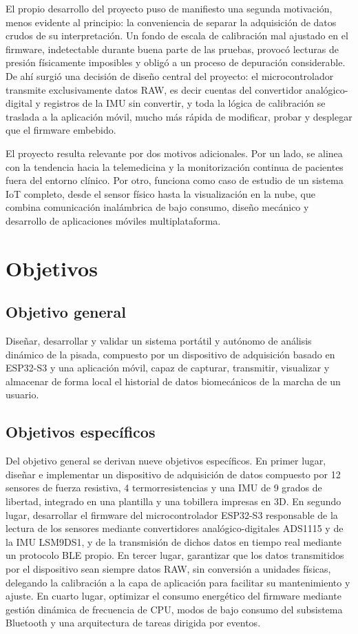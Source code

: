 \begin{IAtext}
El propio desarrollo del proyecto puso de manifiesto una segunda motivación, menos evidente al principio: la conveniencia de separar la adquisición de datos crudos de su interpretación. Un fondo de escala de calibración mal ajustado en el firmware, indetectable durante buena parte de las pruebas, provocó lecturas de presión físicamente imposibles y obligó a un proceso de depuración considerable. De ahí surgió una decisión de diseño central del proyecto: el microcontrolador transmite exclusivamente datos RAW, es decir cuentas del convertidor analógico-digital y registros de la IMU sin convertir, y toda la lógica de calibración se traslada a la aplicación móvil, mucho más rápida de modificar, probar y desplegar que el firmware embebido.

El proyecto resulta relevante por dos motivos adicionales. Por un lado, se alinea con la tendencia hacia la telemedicina y la monitorización continua de pacientes fuera del entorno clínico. Por otro, funciona como caso de estudio de un sistema IoT completo, desde el sensor físico hasta la visualización en la nube, que combina comunicación inalámbrica de bajo consumo, diseño mecánico y desarrollo de aplicaciones móviles multiplataforma.

\section{Objetivos}

\subsection{Objetivo general}

Diseñar, desarrollar y validar un sistema portátil y autónomo de análisis dinámico de la pisada, compuesto por un dispositivo de adquisición basado en ESP32-S3 y una aplicación móvil, capaz de capturar, transmitir, visualizar y almacenar de forma local el historial de datos biomecánicos de la marcha de un usuario.

\subsection{Objetivos específicos}

Del objetivo general se derivan nueve objetivos específicos. En primer lugar, diseñar e implementar un dispositivo de adquisición de datos compuesto por 12 sensores de fuerza resistiva, 4 termorresistencias y una IMU de 9 grados de libertad, integrado en una plantilla y una tobillera impresas en 3D. En segundo lugar, desarrollar el firmware del microcontrolador ESP32-S3 responsable de la lectura de los sensores mediante convertidores analógico-digitales ADS1115 y de la IMU LSM9DS1, y de la transmisión de dichos datos en tiempo real mediante un protocolo BLE propio. En tercer lugar, garantizar que los datos transmitidos por el dispositivo sean siempre datos RAW, sin conversión a unidades físicas, delegando la calibración a la capa de aplicación para facilitar su mantenimiento y ajuste. En cuarto lugar, optimizar el consumo energético del firmware mediante gestión dinámica de frecuencia de CPU, modos de bajo consumo del subsistema Bluetooth y una arquitectura de tareas dirigida por eventos.


\end{IAtext}
